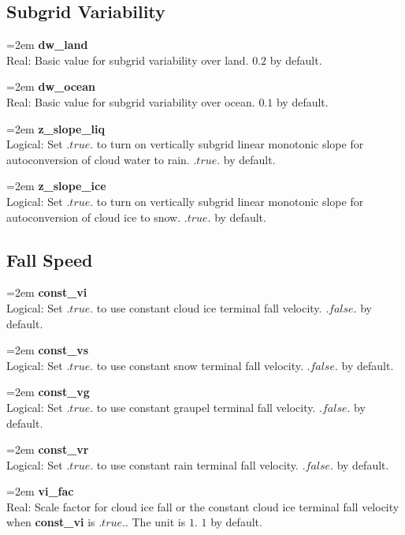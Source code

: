 \documentclass[letterpaper,titlepage,10pt]{article}
\numberwithin{equation}{section}
\begin{document}
\begin{appendices}

\subsection{Subgrid Variability}

\hangindent=2em
\textbf{dw\_land}\\ Real: Basic value for subgrid variability over land. $0.2$ by default.

\hangindent=2em
\textbf{dw\_ocean}\\ Real: Basic value for subgrid variability over ocean. $0.1$ by default.

\hangindent=2em
\textbf{z\_slope\_liq}\\ Logical: Set $.true.$ to turn on vertically subgrid linear monotonic slope for autoconversion of cloud water to rain. $.true.$ by default.

\hangindent=2em
\textbf{z\_slope\_ice}\\ Logical: Set $.true.$ to turn on vertically subgrid linear monotonic slope for autoconversion of cloud ice to snow. $.true.$ by default.


\subsection{Fall Speed}

\hangindent=2em
\textbf{const\_vi}\\ Logical: Set $.true.$ to use constant cloud ice terminal fall velocity. $.false.$ by default.

\hangindent=2em
\textbf{const\_vs}\\ Logical: Set $.true.$ to use constant snow terminal fall velocity. $.false.$ by default.

\hangindent=2em
\textbf{const\_vg}\\ Logical: Set $.true.$ to use constant graupel terminal fall velocity. $.false.$ by default.

\hangindent=2em
\textbf{const\_vr}\\ Logical: Set $.true.$ to use constant rain terminal fall velocity. $.false.$ by default.

\hangindent=2em
\textbf{vi\_fac}\\ Real: Scale factor for cloud ice fall or the constant cloud ice terminal fall velocity when \textbf{const\_vi} is $.true.$. The unit is $1$. $1$ by default.


\end{appendices}
\end{document}
